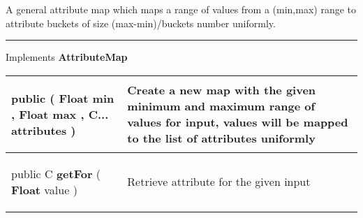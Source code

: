  {\scriptsize A general attribute map which maps a range of values from a (min,max) range to attribute buckets of size (max{-}min)/buckets number uniformly.
 
\vspace*{4pt} \hrule \vspace*{3pt}
Implements \textbf{ AttributeMap }
\vspace*{-5pt} 
\begin{tabularx}{\linewidth}{X|m{}}
\label{tab:UniformAttributeMap}
\begin{raggedleft}public  \textbf{\hyperref[tab:UniformAttributeMap]{\color{blue}{UniformAttributeMap}} }(\newline \hfill 
\hspace*{ 5pt} \textbf{Float} min , \newline
 \hspace*{ 5pt} \textbf{Float} max , \newline
 \hspace*{ 5pt} \textbf{C...} attributes  )
\end{raggedleft} &
 Create a new map with the given minimum and maximum range of values for input, values will be mapped to the list of attributes uniformly\\ \hline 
\begin{raggedleft}public C \textbf{getFor }(\hspace*{ 5pt} \textbf{Float} value  )
\end{raggedleft} &
 Retrieve attribute for the given input\\\end{tabularx}
}
